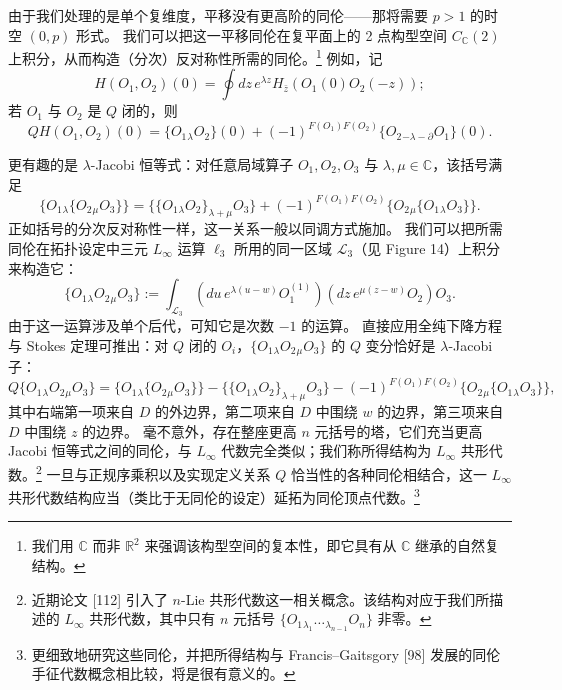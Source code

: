 由于我们处理的是单个复维度，平移没有更高阶的同伦——那将需要 $p>1$ 的时空 $(0,p)$ 形式。
我们可以把这一平移同伦在复平面上的 2 点构型空间 $C_{\mathbb{C}}(2)$ 上积分，从而构造（分次）反对称性所需的同伦。\footnote{我们用 $\mathbb{C}$ 而非 $\mathbb{R}^2$ 来强调该构型空间的复本性，即它具有从 $\mathbb{C}$ 继承的自然复结构。}
例如，记
\begin{equation}\tag{3.70}
H(O_1,O_2)(0)=\oint dz\,e^{\lambda z}H_{\bar z}(O_1(0)O_2(-z));
\end{equation}
若 $O_1$ 与 $O_2$ 是 $Q$ 闭的，则
\begin{equation}\tag{3.71}
QH(O_1,O_2)(0)=\{O_1{}_\lambda O_2\}(0)+(-1)^{F(O_1)F(O_2)}\{O_2{}_{-\lambda-\partial}O_1\}(0).
\end{equation}

更有趣的是 $\lambda$-Jacobi 恒等式：对任意局域算子 $O_1,O_2,O_3$ 与 $\lambda,\mu\in\mathbb{C}$，该括号满足
\begin{equation}\tag{3.72}
\{O_1{}_\lambda\{O_2{}_\mu O_3\}\}=\{\{O_1{}_\lambda O_2\}_{\lambda+\mu}O_3\}+(-1)^{F(O_1)F(O_2)}\{O_2{}_\mu\{O_1{}_\lambda O_3\}\}.
\end{equation}
正如括号的分次反对称性一样，这一关系一般以同调方式施加。
我们可以把所需同伦在拓扑设定中三元 $L_\infty$ 运算 $\ell_3$ 所用的同一区域 $\mathcal{L}_3$（见 Figure 14）上积分来构造它：
\begin{equation}\tag{3.73}
\{O_1{}_\lambda O_2{}_\mu O_3\}:=\int_{\mathcal{L}_3}(du\,e^{\lambda(u-w)}O^{(1)}_1)(dz\,e^{\mu(z-w)}O_2)O_3.
\end{equation}
由于这一运算涉及单个后代，可知它是次数 $-1$ 的运算。
直接应用全纯下降方程与 Stokes 定理可推出：对 $Q$ 闭的 $O_i$，$\{O_1{}_\lambda O_2{}_\mu O_3\}$ 的 $Q$ 变分恰好是 $\lambda$-Jacobi 子：
\begin{equation}\tag{3.74}
Q\{O_1{}_\lambda O_2{}_\mu O_3\}=\{O_1{}_\lambda\{O_2{}_\mu O_3\}\}-\{\{O_1{}_\lambda O_2\}_{\lambda+\mu}O_3\}-(-1)^{F(O_1)F(O_2)}\{O_2{}_\mu\{O_1{}_\lambda O_3\}\},
\end{equation}
其中右端第一项来自 $D$ 的外边界，第二项来自 $D$ 中围绕 $w$ 的边界，第三项来自 $D$ 中围绕 $z$ 的边界。
毫不意外，存在整座更高 $n$ 元括号的塔，它们充当更高 Jacobi 恒等式之间的同伦，与 $L_\infty$ 代数完全类似；我们称所得结构为 $L_\infty$ 共形代数。\footnote{近期论文 [112] 引入了 $n$-Lie 共形代数这一相关概念。该结构对应于我们所描述的 $L_\infty$ 共形代数，其中只有 $n$ 元括号 $\{O_1{}_{\lambda_1}\dots{}_{\lambda_{n-1}}O_n\}$ 非零。}
一旦与正规序乘积以及实现定义关系 $Q$ 恰当性的各种同伦相结合，这一 $L_\infty$ 共形代数结构应当（类比于无同伦的设定）延拓为同伦顶点代数。\footnote{更细致地研究这些同伦，并把所得结构与 Francis--Gaitsgory [98] 发展的同伦手征代数概念相比较，将是很有意义的。}


